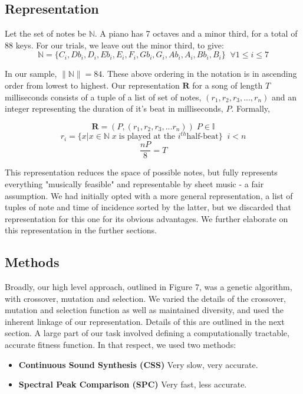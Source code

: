 \documentclass{pnastwo}
\begin{document}
\begin{article}
\subsection{Representation}
Let the set of notes be $\mathbb{N}$. A piano has 7 octaves and a minor third, for a total of 88 keys. For our trials, we leave out the minor third, to give: 
$$\mathbb{N} = \{ C_i,  Db_i, D_i, Eb_i, E_i, F_i, Gb_i, G_i, Ab_i, A_i, Bb_i, B_i \}  \; \; \forall 1 \leq i \leq 7 $$

In our sample, $\|\mathbb{N}\| = 84 $. These above ordering in the notation is in ascending order from lowest to highest. Our representation $\mathbf{R}$ for a song of length $T$ milliseconds consists of a tuple of a list of set of notes, $(r_1, r_2, r_3, ... , r_n)$ and an integer representing the duration of it's beat in milliseconds, $P$. Formally, 

$$ \mathbf{R} = (P, (r_1, r_2, r_3, ... r_n ) ) \; P \in \mathbb{I}  $$
$$ r_i = \{ x | x \in \mathbb{N} \;x \;\text{is played at the } i^{th} \text{half-beat} \} \; \;  i < n$$
$$ \frac{nP}{8} = T $$

This representation reduces the space of possible notes, but fully represents everything "musically feasible" and representable by sheet music - a fair assumption. We had initially opted with a more general representation, a list of tuples of note and time of incidence sorted by the latter, but we discarded that representation for this one for its obvious advantages. We further elaborate on this representation in the further sections. 
\subsection{Methods}
Broadly, our high level approach, outlined in Figure 7, was a genetic algorithm, with crossover, mutation and selection. We varied the details of the crossover, mutation and selection function as well as maintained diversity, and used the inherent linkage of our representation. Details of this are outlined in the next section. A large part of our task involved defining a computationally tractable, accurate fitness function. In that respect, we used two methods:
\begin{itemize}
\item \textbf{Continuous Sound Synthesis (CSS)} Very slow, very accurate.
\item \textbf{Spectral Peak Comparison (SPC)} Very fast, less accurate.
\end{itemize}

\end{article}
\end{document}
